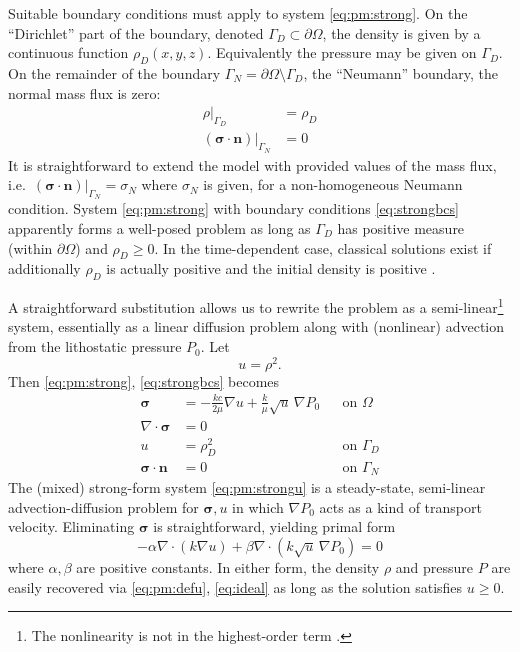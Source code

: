\documentclass[11pt]{amsart}
\newcommand{\bn}{\mathbf{n}}
\newcommand{\bsigma}{\bm{\sigma}}
\newcommand{\Div}{\nabla\cdot}
\newcommand{\grad}{\nabla}
\begin{document}
Suitable boundary conditions must apply to system \eqref{eq:pm:strong}.  On the ``Dirichlet'' part of the boundary, denoted $\Gamma_D \subset \partial\Omega$, the density is given by a continuous function $\rho_D(x,y,z)$.  Equivalently the pressure may be given on $\Gamma_D$.  On the remainder of the boundary $\Gamma_N = \partial\Omega \setminus \Gamma_D$, the ``Neumann'' boundary, the normal mass flux is zero:
\begin{subequations}
\label{eq:strongbcs}
\begin{align}
\rho|_{\Gamma_D}               &= \rho_D \\
(\bsigma\cdot \bn)|_{\Gamma_N} &= 0
\end{align}
\end{subequations}
It is straightforward to extend the model with provided values of the mass flux, i.e.~$(\bsigma\cdot \bn)|_{\Gamma_N}= \sigma_N$ where $\sigma_N$ is given, for a non-homogeneous Neumann condition.  System \eqref{eq:pm:strong} with boundary conditions \eqref{eq:strongbcs} apparently forms a well-posed problem as long as $\Gamma_D$ has positive measure (within $\partial\Omega$) and $\rho_D\ge 0$.  In the time-dependent case, classical solutions exist if additionally $\rho_D$ is actually positive and the initial density is positive \citep[Theorem 3.1]{Vazquez2007}.

A straightforward substitution allows us to rewrite the problem as a semi-linear\footnote{The nonlinearity is not in the highest-order term \citep[section 1.1]{Evans2010}.} system, essentially as a linear diffusion problem along with (nonlinear) advection from the lithostatic pressure $P_0$.  Let
\begin{equation}
u = \rho^2. \label{eq:pm:defu}
\end{equation}
Then \eqref{eq:pm:strong}, \eqref{eq:strongbcs} becomes
\begin{subequations}
\label{eq:pm:strongu}
\begin{align}
\bsigma &= - \frac{k c}{2\mu} \grad u + \frac{k}{\mu} \sqrt{u}\, \grad P_0 & &\text{on } \Omega \label{eq:pm:strongu:darcy} \\
\Div \bsigma &= 0 & & \label{eq:pm:strongu:masscont} \\
u &= \rho_D^2 & &\text{on } \Gamma_D  \label{eq:pm:strongu:bcD} \\
\bsigma\cdot \bn &= 0 & &\text{on } \Gamma_N  \label{eq:pm:strongu:bcN} 
\end{align}
\end{subequations}
The (mixed) strong-form system \eqref{eq:pm:strongu} is a steady-state, semi-linear advection-diffusion problem for $\bsigma,u$ in which $\grad P_0$ acts as a kind of transport velocity.  Eliminating $\bsigma$ is straightforward, yielding primal form
\begin{equation}
-\alpha \Div(k\grad u) + \beta \Div(k \sqrt{u}\, \grad P_0) = 0 \label{eq:pm:primalstrongu}
\end{equation}
where $\alpha,\beta$ are positive constants.  In either form, the density $\rho$ and pressure $P$ are easily recovered via \eqref{eq:pm:defu}, \eqref{eq:ideal} as long as the solution satisfies $u\ge 0$.
\end{document}
